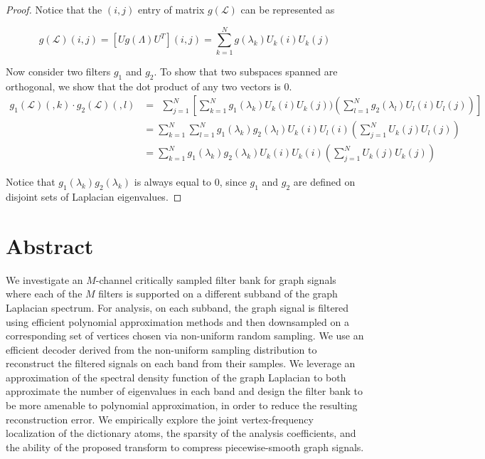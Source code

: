 \documentclass[a4paper]{article}
\newcommand{\La}{\mathcal{L}}
\theoremstyle{definition}
\begin{document}
\begin{proof}


Notice that the $(i,j)$ entry of matrix $g(\La)$ can be represented as 

$$g(\La) (i,j) = [Ug(\Lambda)U^T] (i,j) = \sum_{k = 1}^{N} g(\lambda_k) U_k(i) U_k(j)$$

Now consider two filters $g_1$ and $g_2$. To show that two subspaces spanned are orthogonal, we show that the dot product of any two vectors is 0.
\begin{align*}
g_1(\La)(,k) \cdot g_2(\La)(,l)&=\ \  \sum_{j = 1}^{N} [\sum_{k = 1}^{N} g_1(\lambda_k) U_k(i) U_k(j) )( \sum_{l = 1}^{N} g_2(\lambda_l) U_l(i) U_l(j)) ] \\
& = \sum_{k = 1}^{N} \sum_{l = 1}^{N} g_1(\lambda_k) g_2(\lambda_l)  U_k(i) U_l(i) ( \sum_{j = 1}^{N}  U_k(j)  U_l(j))  \\
& = \sum_{k = 1}^{N} g_1(\lambda_k) g_2(\lambda_k)  U_k(i) U_k(i) ( \sum_{j = 1}^{N}  U_k(j)  U_k(j)) 
\end{align*}

Notice that $g_1(\lambda_k) g_2(\lambda_k)$ is always equal to $0$, since $g_1$ and $g_2$ are defined on disjoint sets of Laplacian eigenvalues.   

\end{proof}








\newpage

\section{Abstract}
     We investigate an $M$-channel critically sampled filter bank for graph signals where each of the $M$ filters is supported on a different subband of the graph Laplacian spectrum. For analysis, on each subband, the graph signal is filtered using efficient polynomial approximation methods and then downsampled on a corresponding set of vertices chosen via non-uniform random sampling. We use an efficient decoder derived from the non-uniform sampling distribution to reconstruct the filtered signals on each band from their samples. We leverage an approximation of the spectral density function of the graph Laplacian to both approximate the number of eigenvalues in each band and design the filter bank to be more amenable to polynomial approximation, in order to reduce the resulting reconstruction error. We empirically explore the joint vertex-frequency localization of the dictionary atoms, the sparsity of the analysis coefficients, and the ability of the proposed transform to compress piecewise-smooth graph signals. 
\end{document}
